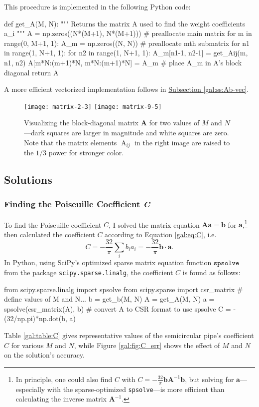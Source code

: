\documentclass[11pt, a4paper]{article}
\newcommand{\mat}[1]{\mathbf{#1}}
\newcommand{\A}{\operatorname{A}}  %
\renewcommand{\vec}[1]{\bm{#1}}
\newcommand{\Pois}{Poiseuille\xspace}  %
\begin{document}
This procedure is implemented in the following Python code:
\begin{python}
def get_A(M, N):
    """ Returns the matrix A used to find the weight coefficients a_i """
    A = np.zeros((N*(M+1), N*(M+1)))  # preallocate main matrix
    for m in range(0, M+1, 1):
        A_m = np.zeros((N, N))        # preallocate mth submatrix
        for n1 in range(1, N+1, 1): 
            for n2 in range(1, N+1, 1): 
                A_m[n1-1, n2-1] = get_Aij(m, n1, n2)
        A[m*N:(m+1)*N, m*N:(m+1)*N] = A_m  # place A_m in A's block diagonal
    return A
\end{python}
A more efficient vectorized implementation follows in \hyperref[gal:ss:Ab-vec]{Subsection \ref{gal:ss:Ab-vec}}. 

\begin{figure}[htb!]
\centering
\texttt{[image: matrix-2-3]} \hfill
\texttt{[image: matrix-9-5]} \hfill
\caption{Visualizing the block-diagonal matrix $ \mat{A} $ for two values of $ M $ and $ N $---dark squares are larger in magnitude and white squares are zero. Note that the matrix elements $ \A_{ij} $ in the right image are raised to the $ 1/3 $ power for stronger color.}
\label{gal:fig:A}
\end{figure}



\subsection{Solutions}

\subsubsection{Finding the \Pois Coefficient \textit{C}}
To find the \Pois coefficient $ C $, I solved the matrix equation $ \mat{A}\vec{a} = \vec{b} $ for $ \vec{a} $,\footnote{In principle, one could also find $ C $ with $ C = - \frac{32}{\pi}\vec{b}\mat{A}^{-1}\vec{b}$, but solving for $ \vec{a} $---especially with the sparse-optimized \texttt{spsolve}---is more efficient than calculating the inverse matrix $ \mat{A}^{-1} $.} then calculated the coefficient $ C $ according to Equation \ref{gal:eq:C}, i.e.
\begin{equation*}
	C = - \frac{32}{\pi}\sum_{i}b_{i}a_{i} =  -\frac{32}{\pi} \vec{b} \cdot \vec{a}.
\end{equation*}
In Python, using SciPy's optimized sparse matrix equation function $ \texttt{spsolve} $ from the package \texttt{scipy.sparse.linalg}, the coefficient $ C $ is found as follows:
\begin{python}
from scipy.sparse.linalg import spsolve
from scipy.sparse import csr_matrix
# define values of M and N...
 b = get_b(M, N)
 A = get_A(M, N)
 a = spsolve(csr_matrix(A), b)  # convert A to CSR format to use spsolve
 C = - (32/np.pi)*np.dot(b, a)
\end{python}
Table \ref{gal:table:C} gives representative values of the semicircular pipe's coefficient $ C $ for various $ M $ and $ N $, while Figure \ref{gal:fig:C_err} shows the effect of $ M $ and $ N $ on the solution's accuracy.
\end{document}
